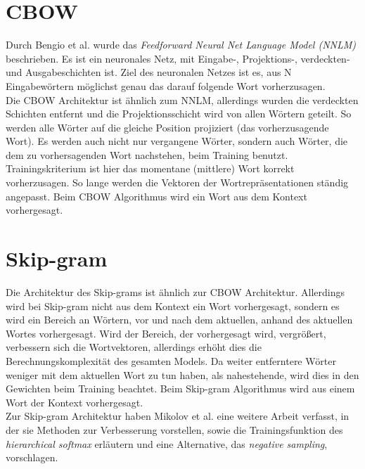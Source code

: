 \documentclass[12pt,a4paper]{report}
\begin{document}
\section*{CBOW}
Durch  Bengio et al. \cite{bengio2003neural} wurde das \textit{Feedforward Neural Net Language Model (NNLM)} beschrieben. Es ist ein neuronales Netz, mit Eingabe-, Projektions-, verdeckten- und Ausgabeschichten ist. Ziel des neuronalen Netzes ist es, aus N Eingabewörtern möglichst genau das darauf folgende Wort vorherzusagen.\\
Die CBOW Architektur ist ähnlich zum NNLM, allerdings wurden die verdeckten Schichten entfernt und die Projektionsschicht wird von allen Wörtern geteilt. So werden alle Wörter auf die gleiche Position projiziert (das vorherzusagende Wort). Es werden auch nicht nur vergangene Wörter, sondern auch Wörter, die dem zu vorhersagenden Wort nachstehen, beim Training benutzt. Trainingskriterium ist hier das momentane (mittlere) Wort korrekt vorherzusagen. So lange werden die Vektoren der Wortrepräsentationen ständig angepasst. Beim CBOW Algorithmus wird ein Wort aus dem Kontext vorhergesagt.



\section*{Skip-gram}
Die Architektur des Skip-grams ist ähnlich zur CBOW Architektur. Allerdings wird bei Skip-gram nicht aus dem Kontext ein Wort vorhergesagt, sondern es wird ein Bereich an Wörtern, vor und nach dem aktuellen, anhand des aktuellen Wortes vorhergesagt. Wird der Bereich, der vorhergesagt wird, vergrößert, verbessern sich die Wortvektoren, allerdings erhöht dies die Berechnungskomplexität des gesamten Models. Da weiter entferntere Wörter weniger mit dem aktuellen Wort zu tun haben, als nahestehende, wird dies in den Gewichten beim Training beachtet\citep{DBLP:journals/corr/abs-1301-3781}. Beim Skip-gram Algorithmus wird aus einem Wort der Kontext vorhergesagt.\\

Zur Skip-gram Architektur haben Mikolov et al. \citep{DBLP:journals/corr/MikolovSCCD13} eine weitere Arbeit verfasst, in der sie Methoden zur Verbesserung vorstellen, sowie die Trainingsfunktion des \textit{hierarchical softmax} erläutern und eine Alternative, das \textit{negative sampling}, vorschlagen.\\
\end{document}
